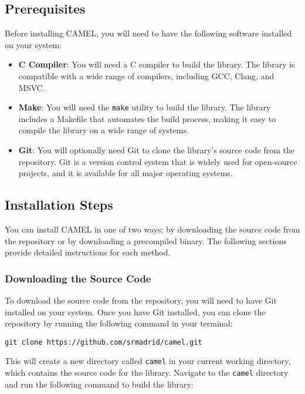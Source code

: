 \documentclass[a4paper,oneside,8pt]{extarticle}
\theoremstyle{definition}
\begin{document}
\subsection{Prerequisites}

Before installing CAMEL, you will need to have the following software installed on your system:
\begin{itemize}
  \item \textbf{C Compiler}: You will need a C compiler to build the library. The library is compatible with a wide range of compilers, including GCC, Clang, and MSVC.
  \item \textbf{Make}: You will need the \texttt{make} utility to build the library. The library includes a Makefile that automates the build process, making it easy to compile the library on a wide range of systems.
  \item \textbf{Git}: You will optionally need Git to clone the library's source code from the repository. Git is a version control system that is widely used for open-source projects, and it is available for all major operating systems.
\end{itemize}

\subsection{Installation Steps}

You can install CAMEL in one of two ways: by downloading the source code from the repository or by downloading a precompiled binary. The following sections provide detailed instructions for each method.

\subsubsection{Downloading the Source Code}

To download the source code from the repository, you will need to have Git installed on your system. Once you have Git installed, you can clone the repository by running the following command in your terminal:

\begin{verbatim}
git clone https://github.com/srmadrid/camel.git
\end{verbatim}

This will create a new directory called \texttt{camel} in your current working directory, which contains the source code for the library. Navigate to the \texttt{camel} directory and run the following command to build the library:
\end{document}
